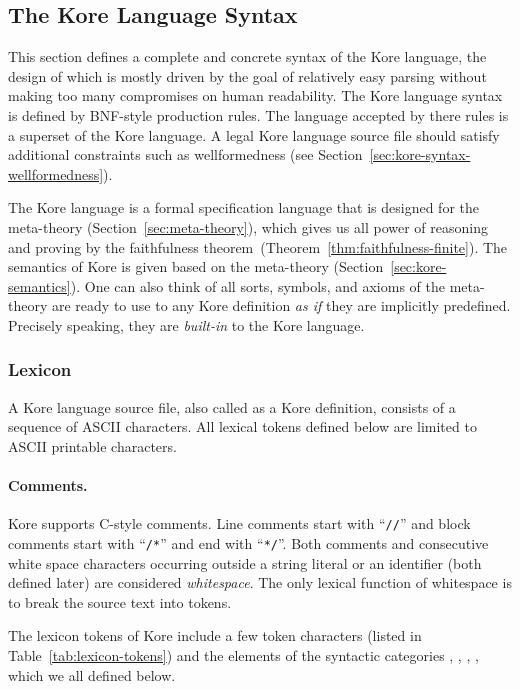 \documentclass[UTF8,11pt]{article}
\theoremstyle{plain}
\theoremstyle{definition}
\theoremstyle{remark}
\newcommand{\syntacc}[1]{\text{$\langle$\textit{#1}$\rangle$}}
\begin{document}
\subsection{The Kore Language Syntax}
This section defines a complete and concrete syntax of the Kore language, the 
design of which is mostly driven by the goal of relatively easy parsing without 
making too many compromises on human readability.
The Kore language syntax is defined by BNF-style production rules.
The language accepted by there rules is a superset of the Kore language. 
A legal Kore language source file should satisfy additional constraints such 
as wellformedness (see Section~\ref{sec:kore-syntax-wellformedness}).

The Kore language is a formal specification language that is designed for the 
meta-theory (Section~\ref{sec:meta-theory}), which gives us all power of 
reasoning and proving by the faithfulness 
theorem~(Theorem~\ref{thm:faithfulness-finite}).
The semantics of Kore is given based on the meta-theory 
(Section~\ref{sec:kore-semantics}).
One can also think of all sorts, symbols, and axioms of the meta-theory are 
ready to use to any Kore definition \emph{as if} they are implicitly predefined.
Precisely speaking, they are \emph{built-in} to the Kore language.

\subsubsection{Lexicon}


A Kore language source file, also called as a Kore definition, consists of a 
sequence of ASCII characters.
All lexical tokens defined below are limited to ASCII printable characters.

\paragraph{Comments.}
Kore supports C-style comments.
Line comments start with ``\verb|//|'' and block comments start with 
``\verb|/*|'' and end with ``\verb|*/|''.
Both comments and consecutive white space characters occurring outside a string 
literal or an identifier (both defined later) are considered \emph{whitespace}.
The only lexical function of whitespace is to break the source text into tokens.

The lexicon tokens of Kore include a few token characters (listed in 
Table~\ref{tab:lexicon-tokens}) and the elements of the syntactic categories
\syntacc{identifier},
\syntacc{char},
\syntacc{string},
\syntacc{keyword}, which we all defined below.
\end{document}
